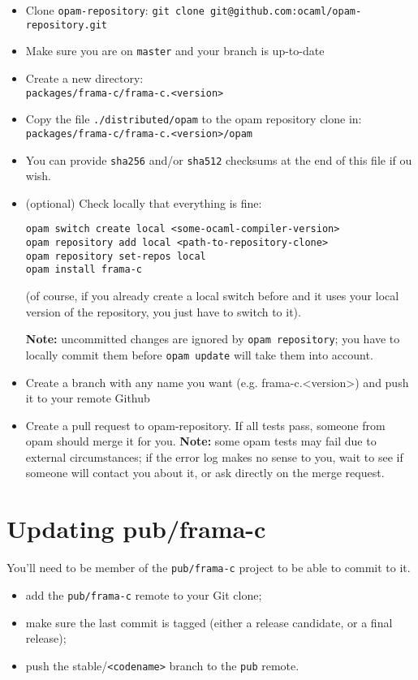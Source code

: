 \begin{itemize}
\item Clone \texttt{opam-repository}: \texttt{git clone git@github.com:ocaml/opam-repository.git}
\item Make sure you are on \texttt{master} and your branch is up-to-date
\item Create a new directory: \\
  \texttt{packages/frama-c/frama-c.<version>}
\item Copy the file \texttt{./distributed/opam} to the opam repository clone in: \\
 \texttt{packages/frama-c/frama-c.<version>/opam}
\item You can provide \verb|sha256| and/or \verb|sha512| checksums at the end of this file if ou wish.
\item (optional) Check locally that everything is fine:
\begin{verbatim}
opam switch create local <some-ocaml-compiler-version>
opam repository add local <path-to-repository-clone>
opam repository set-repos local
opam install frama-c
\end{verbatim}
(of course, if you already create a local switch before and it uses your
local version of the repository, you just have to switch to it).

\textbf{Note:} uncommitted changes are ignored by \texttt{opam repository};
you have to locally commit them before \texttt{opam update} will take them into
account.

\item Create a branch with any name you want (e.g. frama-c.<version>) and push it to your remote Github
\item Create a pull request to opam-repository. If all tests pass,
  someone from opam should merge it for you.
  \textbf{Note:} some opam tests may fail due to external circumstances; if the
  error log makes no sense to you, wait to see if someone will contact you
  about it, or ask directly on the merge request.
\end{itemize}

\section{Updating pub/frama-c}

You'll need to be member of the \texttt{pub/frama-c} project to be able to
commit to it.

\begin{itemize}
\item add the \texttt{pub/frama-c} remote to your Git clone;
\item make sure the last commit is tagged (either a release candidate, or a
  final release);
\item push the stable/\texttt{<codename>} branch to the \texttt{pub} remote.
\end{itemize}

